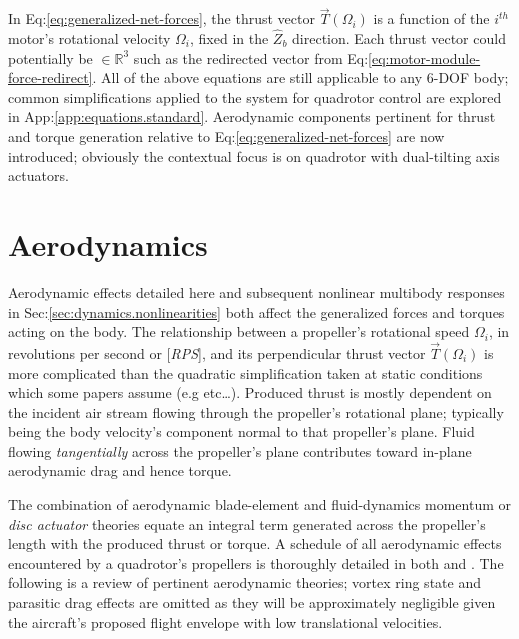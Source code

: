 In Eq:\ref{eq:generalized-net-forces}, the thrust vector $\vec{T}(\Omega_i)$ is a function of the $i^{th}$ motor's rotational velocity $\Omega_i$, fixed in the $\hat{Z}_b$ direction. Each thrust vector could potentially be $\in\mathbb{R}^3$ such as the redirected vector from Eq:\ref{eq:motor-module-force-redirect}. All of the above equations are still applicable to any 6-DOF body; common simplifications applied to the system for quadrotor control are explored in App:\ref{app:equations.standard}. Aerodynamic components pertinent for thrust and torque generation relative to Eq:\ref{eq:generalized-net-forces} are now introduced; obviously the contextual focus is on quadrotor with dual-tilting axis actuators.
\section{Aerodynamics}
\label{sec:dynamics.aero}
Aerodynamic effects detailed here and subsequent nonlinear multibody responses in Sec:\ref{sec:dynamics.nonlinearities} both affect the generalized forces and torques acting on the body. The relationship between a propeller's rotational speed $\Omega_i$, in revolutions per second or [\emph{RPS}], and its perpendicular thrust vector $\vec{T}(\Omega_i)$ is more complicated than the quadratic simplification taken at static conditions which some papers assume (e.g \cite{x4flyer} etc\ldots). Produced thrust is mostly dependent on the incident air stream flowing through the propeller's rotational plane; typically being the body velocity's component normal to that propeller's plane. Fluid flowing \emph{tangentially} across the propeller's plane contributes toward in-plane aerodynamic drag and hence torque. 
\par
The combination of aerodynamic blade-element\cite{bem,forwarddescent} and fluid-dynamics momentum or \emph{disc actuator} theories equate an integral term generated across the propeller's length with the produced thrust or torque. A schedule of all aerodynamic effects encountered by a quadrotor's propellers is thoroughly detailed in both \cite{bladesforquadrotors} and \cite{nonlineardynamics}. The following is a review of pertinent aerodynamic theories; vortex ring state and parasitic drag effects are omitted as they will be approximately negligible given the aircraft's proposed flight envelope with low translational velocities.
